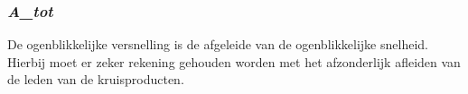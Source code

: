 \documentclass{article}
\begin{document}
\subsubsection{\textbf{\textit{A\_tot}}}
\begin{maplelatex}\begin{Maple Normal}{
De ogenblikkelijke versnelling is de afgeleide van de ogenblikkelijke snelheid. Hierbij moet er zeker rekening gehouden worden met het afzonderlijk afleiden van de leden van de kruisproducten.}\end{Maple Normal}
\end{maplelatex}
\begin{maplegroup}
\begin{mapleinput}
\end{mapleinput}
\mapleresult
{}
\end{maplegroup}
\begin{maplegroup}
\begin{mapleinput}
\end{mapleinput}
\mapleresult
{}
\end{maplegroup}
\begin{maplegroup}
\begin{mapleinput}
\end{mapleinput}
\mapleresult
{}
\end{maplegroup}
\end{document}
